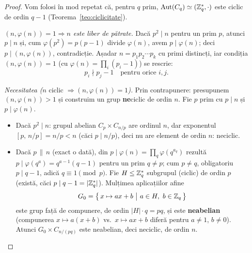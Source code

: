 \begin{proof}
Vom folosi în mod repetat că, pentru $q$ prim, $\operatorname{Aut}(C_q)\simeq(\mathbb{Z}_q^*,\cdot)$ este ciclic de ordin $q-1$ (Teorema~\ref{teo:ciclicitate}).

\smallskip
\emph{$(n,\varphi(n))=1\Rightarrow n$ este liber de pătrate.} Dacă $p^2\mid n$ pentru un prim $p$, atunci $p\mid n$ și, cum $\varphi(p^2)=p(p-1)$ divide $\varphi(n)$, avem $p\mid\varphi(n)$; deci $p\mid(n,\varphi(n))$, contradicție. Așadar $n=p_1p_2\cdots p_k$ cu primi distincți, iar condiția $(n,\varphi(n))=1$ (cu $\varphi(n)=\prod_i(p_i-1)$) se rescrie:
\[
p_i\nmid p_j-1\quad\text{pentru orice }i,j.\tag{$\ast$}
\]

\smallskip
\emph{Necesitatea (}$n$ ciclic $\Rightarrow(n,\varphi(n))=1$\emph{).} Prin contrapunere: presupunem $(n,\varphi(n))>1$ și construim un grup \textbf{ne}ciclic de ordin $n$. Fie $p$ prim cu $p\mid n$ și $p\mid\varphi(n)$.
\begin{itemize}[nosep,leftmargin=1.4em]
\item Dacă $p^2\mid n$: grupul abelian $C_p\times C_{n/p}$ are ordinul $n$, dar exponentul $[p,\,n/p]=n/p<n$ (căci $p\mid n/p$), deci nu are element de ordin $n$: neciclic.
\item Dacă $p\,\|\,n$ (exact o dată), din $p\mid\varphi(n)=\prod_{q}\varphi(q^{a_q})$ rezultă $p\mid\varphi(q^{a})=q^{a-1}(q-1)$ pentru un prim $q\neq p$; cum $p\neq q$, obligatoriu $p\mid q-1$, adică $q\equiv1\pmod p$. Fie $H\le\mathbb{Z}_q^*$ subgrupul (ciclic) de ordin $p$ (există, căci $p\mid q-1=|\mathbb{Z}_q^*|$). Mulțimea aplicațiilor afine
\[
G_0=\bigl\{\,x\mapsto ax+b\ \big|\ a\in H,\ b\in\ZZ_q\,\bigr\}
\]
este grup față de compunere, de ordin $|H|\cdot q=pq$, și este \textbf{neabelian} (compunerea $x\mapsto a(x+b)$ vs.\ $x\mapsto ax+b$ diferă pentru $a\neq1$, $b\neq0$). Atunci $G_0\times C_{n/(pq)}$ este neabelian, deci neciclic, de ordin $n$.
\end{itemize}


\end{proof}
